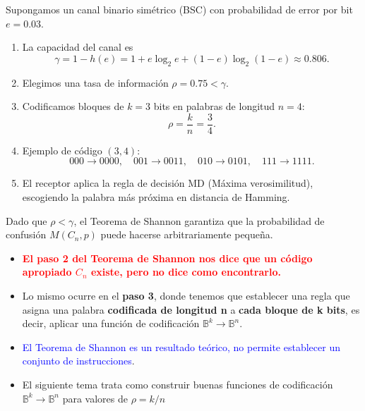 \documentclass{beamer}
\theoremstyle{plain}
\theoremstyle{example}
\theoremstyle{example}
\begin{document}
\begin{frame}  \small 

Supongamos un canal binario simétrico (BSC) con probabilidad de error por bit $e = 0.03$.

\begin{enumerate}
  \item La capacidad del canal es
  \[
  \gamma = 1 - h(e) = 1 + e\log_2 e + (1-e)\log_2(1-e)
  \approx 0.806.
  \]
  \item Elegimos una tasa de información $\rho = 0.75 < \gamma$.
  \item Codificamos bloques de $k=3$ bits en palabras de longitud $n=4$:
  \[
  \rho = \frac{k}{n} = \frac{3}{4}.
  \]
  \item Ejemplo de código $(3,4)$:
  \[
  000 \to 0000, \quad 001 \to 0011, \quad 010 \to 0101, \quad 111 \to 1111.
  \]
  \item El receptor aplica la regla de decisión MD (Máxima verosimilitud),
  escogiendo la palabra más próxima en distancia de Hamming.
\end{enumerate}

Dado que $\rho < \gamma$, el Teorema de Shannon garantiza que la probabilidad
de confusión $M(C_n,p)$ puede hacerse arbitrariamente pequeña.

\end{frame} 
\begin{frame}  \small  
\begin{itemize} 

\item  \textcolor{red}{\textbf{El paso 2 del Teorema de Shannon nos dice que un código apropiado $C_n$ existe, pero no dice como encontrarlo.}}

\item Lo mismo ocurre en el \textbf{paso 3}, donde tenemos que establecer una regla que asigna una palabra \textbf{codificada de longitud n} a \textbf{cada bloque de k bits}, es decir, aplicar una función de codificación $\mathbb{B}^k\rightarrow \mathbb{B}^n$.

\item \textcolor{blue}{El Teorema de Shannon es un resultado teórico, no permite establecer un conjunto de instrucciones}.

\item El siguiente tema trata como construir buenas funciones de codificación $\mathbb{B}^k\rightarrow \mathbb{B}^n$ para valores de $\rho = k/n$


\end{itemize} 
\end{frame} 
\end{document}
